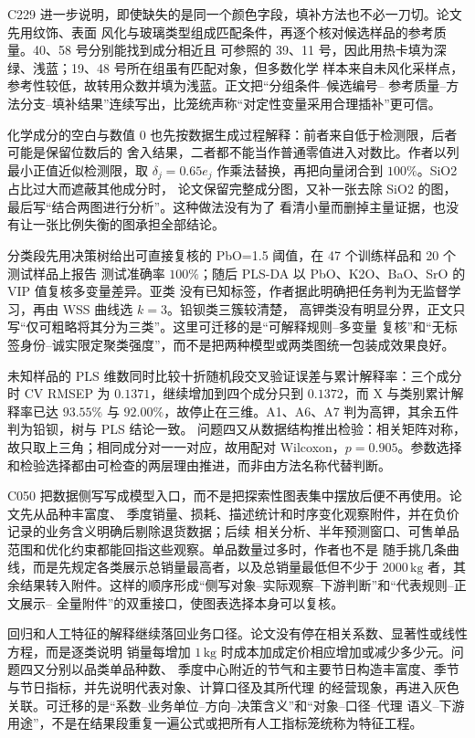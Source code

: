 \documentclass[UTF8,a4paper,12pt]{ctexart}
\begin{document}
C229 进一步说明，即使缺失的是同一个颜色字段，填补方法也不必一刀切。论文先用纹饰、表面
风化与玻璃类型组成匹配条件，再逐个核对候选样品的参考质量。40、58 号分别能找到成分相近且
可参照的 39、11 号，因此用热卡填为深绿、浅蓝；19、48 号所在组虽有匹配对象，但多数化学
样本来自未风化采样点，参考性较低，故转用众数并填为浅蓝。正文把“分组条件--候选编号--
参考质量--方法分支--填补结果”连续写出，比笼统声称“对定性变量采用合理插补”更可信。

化学成分的空白与数值 0 也先按数据生成过程解释：前者来自低于检测限，后者可能是保留位数后的
舍入结果，二者都不能当作普通零值进入对数比。作者以列最小正值近似检测限，取
$\delta_j=0.65e_j$ 作乘法替换，再把向量闭合到 $100\%$。SiO2 占比过大而遮蔽其他成分时，
论文保留完整成分图，又补一张去除 SiO2 的图，最后写“结合两图进行分析”。这种做法没有为了
看清小量而删掉主量证据，也没有让一张比例失衡的图承担全部结论。

分类段先用决策树给出可直接复核的 PbO=1.5 阈值，在 47 个训练样品和 20 个测试样品上报告
测试准确率 $100\%$；随后 PLS-DA 以 PbO、K2O、BaO、SrO 的 VIP 值复核多变量差异。亚类
没有已知标签，作者据此明确把任务判为无监督学习，再由 WSS 曲线选 $k=3$。铅钡类三簇较清楚，
高钾类没有明显分界，正文只写“仅可粗略将其分为三类”。这里可迁移的是“可解释规则--多变量
复核”和“无标签身份--诚实限定聚类强度”，而不是把两种模型或两类图统一包装成效果良好。

未知样品的 PLS 维数同时比较十折随机段交叉验证误差与累计解释率：三个成分时 CV RMSEP 为
$0.1371$，继续增加到四个成分只到 $0.1372$，而 X 与类别累计解释率已达 $93.55\%$ 与
$92.00\%$，故停止在三维。A1、A6、A7 判为高钾，其余五件判为铅钡，树与 PLS 结论一致。
问题四又从数据结构推出检验：相关矩阵对称，故只取上三角；相同成分对一一对应，故用配对
Wilcoxon，$p=0.905$。参数选择和检验选择都由可检查的两层理由推进，而非由方法名称代替判断。

C050 把数据侧写写成模型入口，而不是把探索性图表集中摆放后便不再使用。论文先从品种丰富度、
季度销量、损耗、描述统计和时序变化观察附件，并在负价记录的业务含义明确后剔除退货数据；后续
相关分析、半年预测窗口、可售单品范围和优化约束都能回指这些观察。单品数量过多时，作者也不是
随手挑几条曲线，而是先规定各类展示总销量最高者，以及总销量最低但不少于 $2000\,\mathrm{kg}$
者，其余结果转入附件。这样的顺序形成“侧写对象--实际观察--下游判断”和“代表规则--正文展示--
全量附件”的双重接口，使图表选择本身可以复核。

回归和人工特征的解释继续落回业务口径。论文没有停在相关系数、显著性或线性方程，而是逐类说明
销量每增加 $1\,\mathrm{kg}$ 时成本加成定价相应增加或减少多少元。问题四又分别以品类单品种数、
季度中心附近的节气和主要节日构造丰富度、季节与节日指标，并先说明代表对象、计算口径及其所代理
的经营现象，再进入灰色关联。可迁移的是“系数--业务单位--方向--决策含义”和“对象--口径--代理
语义--下游用途”，不是在结果段重复一遍公式或把所有人工指标笼统称为特征工程。
\end{document}
